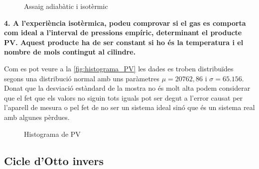 \documentclass[a4paper]{article}
\begin{document}
\begin{figure}[!h]
\centering
\caption{Assaig adiabàtic  i isotèrmic}
\label{fig:asssaig_ad_iso}
\end{figure}

\textbf{4. A l’experiència isotèrmica, podeu comprovar si el gas es comporta com ideal a l’interval de pressions empíric, determinant el producte PV. Aquest producte ha de ser constant si ho és la temperatura i el nombre de mols contingut al cilindre.}

Com es pot veure a la \autoref{fig:histograma_PV} les dades es troben distribuïdes segons una distribució normal amb uns paràmetres $\mu = 20762,86$ i $\sigma = 65.156$. Donat que la desviació estàndard de la mostra no és molt alta podem considerar que el fet que els valors no siguin tots iguals pot ser degut a l'error causat per l'aparell de mesura o pel fet de no ser un sistema ideal sinó que és un sistema real amb algunes pèrdues.

\begin{figure}[H]
\centering
\caption{Histograma de PV}
\label{fig:histograma_PV}
\end{figure}

\subsection*{Cicle d'Otto invers}
\end{document}
